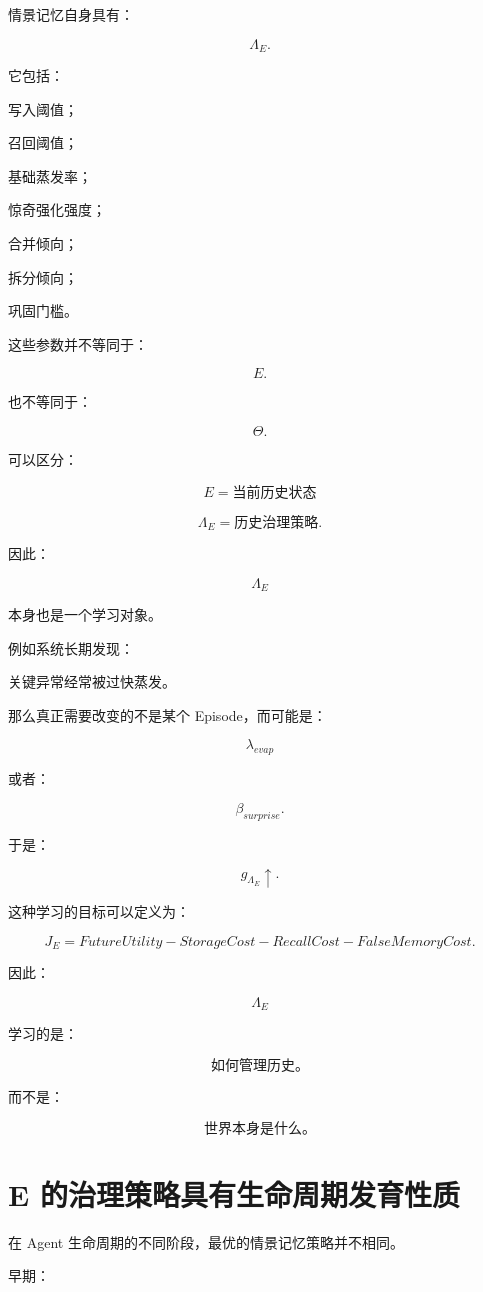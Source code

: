 情景记忆自身具有：

\[
\Lambda_E.
\]

它包括：

写入阈值；

召回阈值；

基础蒸发率；

惊奇强化强度；

合并倾向；

拆分倾向；

巩固门槛。

这些参数并不等同于：

\[
E.
\]

也不等同于：

\[
\Theta.
\]

可以区分：

\[
\boxed{
E=\text{当前历史状态}
}
\]

\[
\boxed{
\Lambda_E=\text{历史治理策略}.
}
\]

因此：

\[
\Lambda_E
\]

本身也是一个学习对象。

例如系统长期发现：

关键异常经常被过快蒸发。

那么真正需要改变的不是某个 Episode，而可能是：

\[
\lambda_{evap}
\]

或者：

\[
\beta_{surprise}.
\]

于是：

\[
\boxed{
g_{\Lambda_E}\uparrow.
}
\]

这种学习的目标可以定义为：

\[
\boxed{
J_E
=
FutureUtility
-
StorageCost
-
RecallCost
-
FalseMemoryCost.
}
\]

因此：

\[
\boxed{
\Lambda_E
}
\]

学习的是：

\[
\boxed{
\textbf{如何管理历史。}
}
\]

而不是：

\[
\boxed{
\textbf{世界本身是什么。}
}
\]


\section{E 的治理策略具有生命周期发育性质}

在 Agent 生命周期的不同阶段，最优的情景记忆策略并不相同。

早期：

